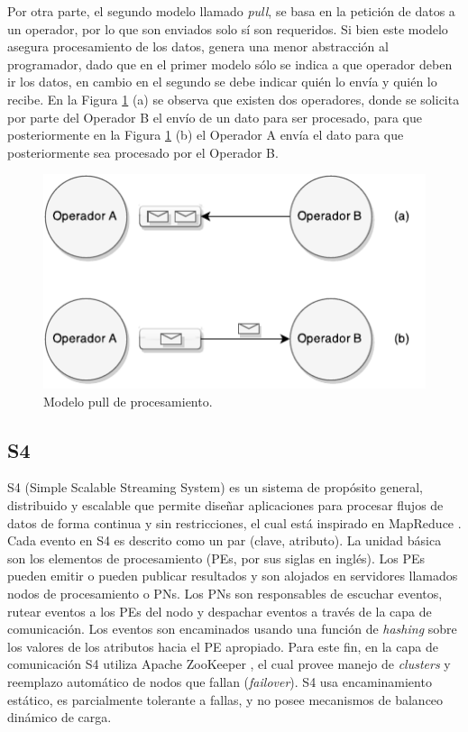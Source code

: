 Por otra parte, el segundo modelo llamado \textit{pull}, se basa en la petición de datos a un operador, por lo que son enviados solo sí son requeridos. Si bien este modelo asegura procesamiento de los datos, genera una menor abstracción al programador, dado que en el primer modelo sólo se indica a que operador deben ir los datos, en cambio en el segundo se debe indicar quién lo envía y quién lo recibe. En la Figura \ref{fig:sps-pull} (a) se observa que existen dos operadores, donde se solicita por parte del Operador B el envío de un dato para ser procesado, para que posteriormente en la Figura \ref{fig:sps-pull} (b) el Operador A envía el dato para que posteriormente sea procesado por el Operador B.

\begin{figure}[ht!]
  \centering
    \includegraphics[scale=1]{images/SPS-Pull.pdf}
  \caption{Modelo pull de procesamiento.}
  \label{fig:sps-pull}
\end{figure}

\subsection{S4}
S4 (Simple Scalable Streaming System) \citep{s4yahoo} es un sistema de propósito general, distribuido y escalable que permite diseñar aplicaciones para procesar flujos de datos de forma continua y sin restricciones, el cual está inspirado en MapReduce \citep{2010Lin}. Cada evento en S4 es descrito como un par (clave, atributo). La unidad básica son los elementos de procesamiento (PEs, por sus siglas en inglés). Los PEs pueden emitir o pueden publicar resultados y son alojados en servidores llamados nodos de procesamiento o PNs. Los PNs son responsables de escuchar eventos, rutear eventos a los PEs del nodo y despachar eventos a través de la capa de comunicación. Los eventos son encaminados usando una función de \textsl{hashing} sobre los valores de los atributos hacia el PE apropiado. Para este fin, en la capa de comunicación S4 utiliza Apache ZooKeeper \citep{HuntKJR10}, el cual provee manejo de \textit{clusters} y reemplazo automático de nodos que fallan (\textit{failover}). S4 usa encaminamiento estático, es parcialmente tolerante a fallas, y no posee mecanismos de balanceo dinámico de carga.

